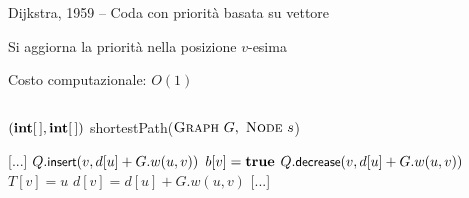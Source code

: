 \begin{frame}{Dijkstra, 1959 -- Coda con priorità basata su vettore}

\vspace{-9pt}
\begin{myboxtitle}
\BI
\item Si aggiorna la priorità nella posizione $v$-esima
\item Costo computazionale: $O(1)$
\EI
\end{myboxtitle}
    
\vspace{-18pt}
\begin{columns}
\small
\begin{Procedure}
\caption[A]{$(\INTARRAY, \INTARRAY)$ \textsf{shortestPath}($\textsc{Graph}\ G,\ \textsc{Node}\ s$)}
[...]\;
    {
      {
        $Q.\textsf{{\small insert}}(v, d[u]+G.w(u,v))$\;
        $b[v] = \TRUE$\;
      }
      {
        \alert{$Q.\textsf{{\small decrease}}(v, d[u]+G.w(u,v))$}
      }
      $T[v] = u$\;
      $d[v] = d[u] + G.w(u,v)$\;
    }
[...]\;
\end{Procedure}
\end{columns}

\end{frame}

